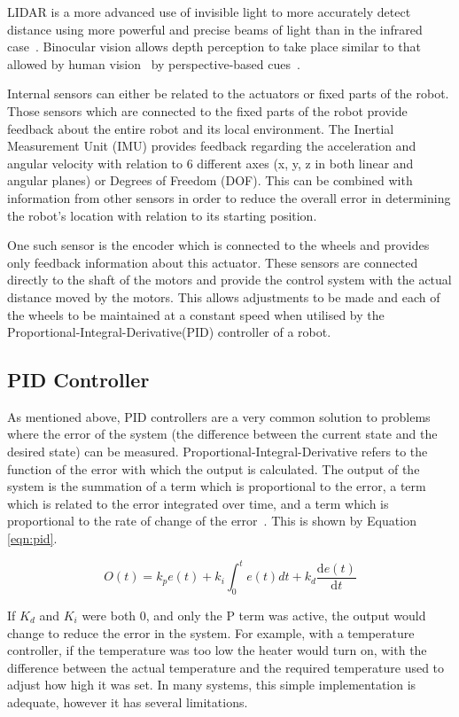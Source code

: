 LIDAR is a more advanced use of invisible light to more accurately detect
distance using more powerful and precise beams of light than in the infrared
case~\cite{lidar}. Binocular vision allows depth perception to take place
similar to that allowed by human vision~\cite{read2005early} by perspective-based cues~\cite{pfautz2002depth}.

Internal sensors can either be related to the actuators or fixed parts of the
robot. Those sensors which are connected to the fixed parts of the robot provide
feedback about the entire robot and its local environment. The Inertial
Measurement Unit (IMU) provides feedback regarding the acceleration and angular
velocity with relation to 6 different axes (x, y, z in both linear and angular
planes) or Degrees of Freedom (DOF). This can be combined with information from
other sensors in order to reduce the overall error in determining the robot's
location with relation to its starting position.

One such sensor is the encoder which is connected to the wheels and provides
only feedback information about this actuator. These sensors are connected
directly to the shaft of the motors and provide the control system with the
actual distance moved by the motors. This allows adjustments to be made and each
of the wheels to be maintained at a constant speed when utilised by the
Proportional-Integral-Derivative(PID) controller of a robot.

\subsection{PID Controller}\label{litreview/robotics/pid}
As mentioned above, PID controllers are a very common solution to problems where the error of the
system (the difference between the current state and the desired state) can be
measured. Proportional-Integral-Derivative refers to the
function of the error with which the output is calculated. The output of the
system is the summation of a term which is proportional to the error, a term
which is related to the error integrated over time, and a term which is
proportional to the rate of change of the error~\cite{aastrom2006advanced}. This is shown by Equation \ref{eqn:pid}.

\begin{equation}
\label{eqn:pid}
O(t) = k_{p}e(t) + k_i\int_{0}^{t}e(t)dt + k_d \frac{\mathrm{d} e(t) }{\mathrm{d} t}
\end{equation}

If $K_d$ and $K_i$ were both 0, and only the P term was active, the output
would change to reduce the error in the system. For example, with a
temperature controller, if the temperature was too low the heater would
turn on, with the difference between the actual temperature and the required
temperature used to adjust how high it was set. In many systems, this simple
implementation is adequate, however it has several limitations.

